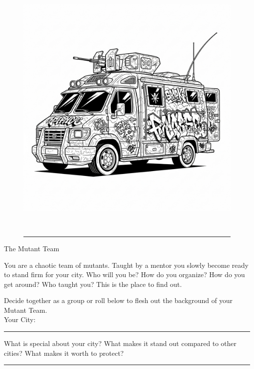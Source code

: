 
\vspace*{\fill}

\begin{figure}[h!]
\centering\includegraphics[height=13cm]{images/van.png}
\vspace{-\baselineskip}\vspace{+0.1pt}
\rule{\linewidth}{2pt}
\end{figure}
\Huge{}The Mutant Team

\normalfont\large
\medskip

You are a chaotic team of mutants. Taught by a mentor you slowly become ready to stand firm for your city. Who will you be? How do you organize? How do you get around? Who taught you? This is the place to find out.

\newpage

\normalfont\large
\medskip

Decide together as a group or roll below to flesh out the background of your Mutant Team. \medskip\\

\Large{}Your City: \rule{0.5\linewidth}{1pt}
\normalfont\large
\medskip

What is special about your city? What makes it stand out compared to other cities? What makes it worth to protect? \rule{0.5\linewidth}{1pt}

